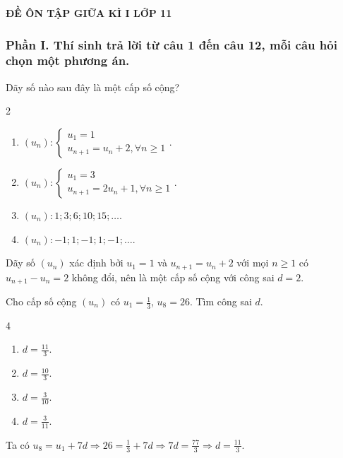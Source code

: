 \begin{center}
	\textbf{{\Huge ĐỀ ÔN TẬP GIỮA KÌ I LỚP 11}}
\end{center}
\subsubsection*{Phần I. Thí sinh trả lời từ câu 1 đến câu 12, mỗi câu hỏi chọn một phương án.}
\setcounter{bt}{0}\setcounter{bt}{0}
\begin{baitap}
	Dãy số nào sau đây là một cấp số cộng?
	\begin{multicols}{2}
		\begin{enumerate}
			\item $(u_n): \begin{cases} u_1 = 1 \\ u_{n+1} = u_n + 2, \forall n \ge 1 \end{cases}$.
			\item $(u_n): \begin{cases} u_1 = 3 \\ u_{n+1} = 2u_n + 1, \forall n \ge 1 \end{cases}$.
			\item $(u_n): 1; 3; 6; 10; 15; \ldots$.
			\item $(u_n): -1; 1; -1; 1; -1; \ldots$.
		\end{enumerate}
	\end{multicols}
	\begin{traloi}
		Dãy số $(u_n)$ xác định bởi $u_1 = 1$ và $u_{n+1} = u_n + 2$ với mọi $n \ge 1$ có $u_{n+1} - u_n = 2$ không đổi, nên là một cấp số cộng với công sai $d = 2$.
	\end{traloi}
\end{baitap}

\begin{baitap}
	Cho cấp số cộng $(u_n)$ có $u_1 = \frac{1}{3}$, $u_8 = 26$. Tìm công sai $d$.
	\begin{multicols}{4}
		\begin{enumerate}
			\item $d = \frac{11}{3}$.
			\item $d = \frac{10}{3}$.
			\item $d = \frac{3}{10}$.
			\item $d = \frac{3}{11}$.
		\end{enumerate}
	\end{multicols}
	\begin{traloi}
		\dapan{A}
		Ta có $u_8 = u_1 + 7d \Rightarrow 26 = \frac{1}{3} + 7d \Rightarrow 7d = \frac{77}{3} \Rightarrow d = \frac{11}{3}$.
	\end{traloi}
\end{baitap}


